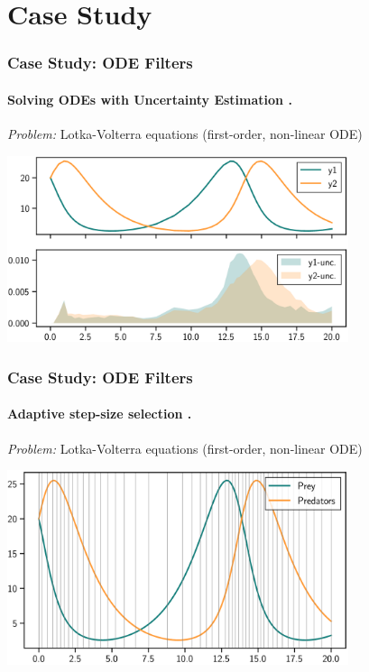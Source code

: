 \documentclass[10pt,usepdftitle=false,aspectratio=169]{beamer}
\begin{document}
\section{Case Study}

\begin{frame}\frametitle{Case Study: ODE Filters}
	\framesubtitle{Solving ODEs with Uncertainty Estimation \cite{Schober2019,Bosch2021}.}

	\emph{Problem:} Lotka-Volterra equations (first-order, non-linear ODE)

	\begin{center}
		\includegraphics[width=0.75\textwidth]{figures/lotka-volterra-uncertainty.png}
	\end{center}

\end{frame}

\begin{frame}\frametitle{Case Study: ODE Filters}
	\framesubtitle{Adaptive step-size selection \cite{Schober2019,Bosch2021}.}

	\emph{Problem:} Lotka-Volterra equations (first-order, non-linear ODE)

	\begin{center}
		\includegraphics[width=0.75\textwidth]{figures/lotka-volterra-step-size.png}
	\end{center}

\end{frame}
\end{document}

